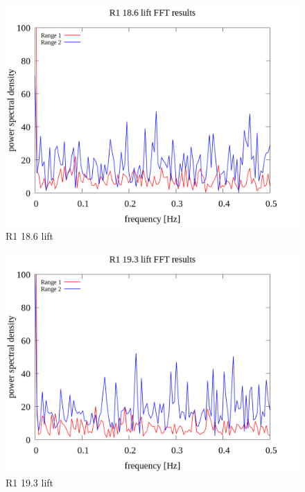 \documentclass[a4paper]{jsarticle}
\begin{document}
\begin{figure}[htbp]
    \footnotesize
    \begin{center}
        \includegraphics[width=130mm]{../images/R1_18.6_lift_08.png}
        \caption{R1 18.6 lift}
    \end{center}
\end{figure}

\begin{figure}[htbp]
    \footnotesize
    \begin{center}
        \includegraphics[width=130mm]{../images/R1_19.3_lift_08.png} 
        \caption{R1 19.3 lift}
    \end{center}
\end{figure}
\end{document}
